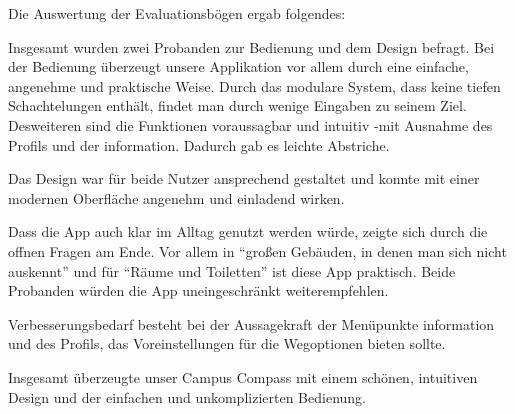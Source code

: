 Die Auswertung der Evaluationsbögen ergab folgendes:

Insgesamt wurden zwei Probanden zur Bedienung und dem Design befragt. 
Bei der Bedienung überzeugt unsere Applikation vor allem durch eine einfache, angenehme und praktische Weise. Durch das modulare System, dass keine tiefen Schachtelungen enthält, findet man durch wenige Eingaben zu seinem Ziel.
Desweiteren sind die Funktionen voraussagbar und intuitiv -mit Ausnahme des Profils und der \gls{information}. Dadurch gab es leichte Abstriche.

Das Design war für beide Nutzer ansprechend gestaltet und konnte mit einer modernen Oberfläche angenehm und einladend wirken.

Dass die App auch klar im Alltag genutzt werden würde, zeigte sich durch die offnen Fragen am Ende. Vor allem in “großen Gebäuden, in denen man sich nicht auskennt” und für “Räume und Toiletten” ist diese App praktisch.
Beide Probanden würden die App uneingeschränkt weiterempfehlen.

Verbesserungsbedarf besteht bei der Aussagekraft der Menüpunkte \gls{information} und des Profils, das Voreinstellungen für die Wegoptionen bieten sollte.

Insgesamt überzeugte unser Campus Compass mit einem schönen, intuitiven Design und der einfachen und unkomplizierten Bedienung.